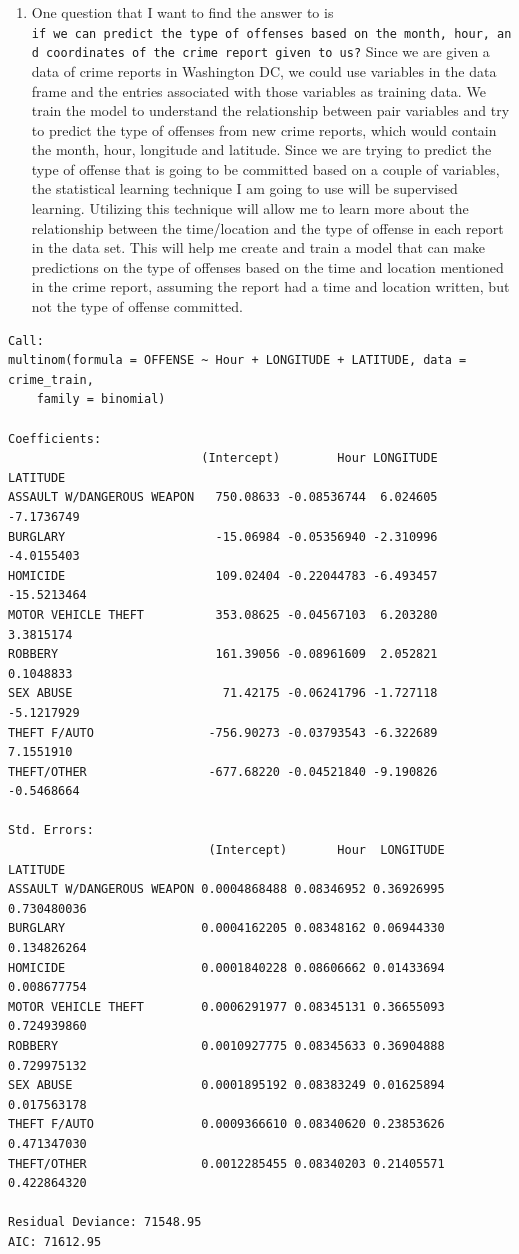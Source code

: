 \documentclass[
]{article}
\providecommand{\tightlist}{%
  \setlength{\itemsep}{0pt}\setlength{\parskip}{0pt}}
\begin{document}
\begin{enumerate}
\def\labelenumi{\arabic{enumi}.}
\tightlist
\item
  One question that I want to find the answer to is
  \texttt{if\ we\ can\ predict\ the\ type\ of\ offenses\ based\ on\ the\ month,\ hour,\ and\ coordinates\ of\ the\ crime\ report\ given\ to\ us?}
  Since we are given a data of crime reports in Washington DC, we could
  use variables in the data frame and the entries associated with those
  variables as training data. We train the model to understand the
  relationship between pair variables and try to predict the type of
  offenses from new crime reports, which would contain the month, hour,
  longitude and latitude. Since we are trying to predict the type of
  offense that is going to be committed based on a couple of variables,
  the statistical learning technique I am going to use will be
  supervised learning. Utilizing this technique will allow me to learn
  more about the relationship between the time/location and the type of
  offense in each report in the data set. This will help me create and
  train a model that can make predictions on the type of offenses based
  on the time and location mentioned in the crime report, assuming the
  report had a time and location written, but not the type of offense
  committed.
\end{enumerate}

\begin{verbatim}
Call:
multinom(formula = OFFENSE ~ Hour + LONGITUDE + LATITUDE, data = crime_train, 
    family = binomial)

Coefficients:
                           (Intercept)        Hour LONGITUDE    LATITUDE
ASSAULT W/DANGEROUS WEAPON   750.08633 -0.08536744  6.024605  -7.1736749
BURGLARY                     -15.06984 -0.05356940 -2.310996  -4.0155403
HOMICIDE                     109.02404 -0.22044783 -6.493457 -15.5213464
MOTOR VEHICLE THEFT          353.08625 -0.04567103  6.203280   3.3815174
ROBBERY                      161.39056 -0.08961609  2.052821   0.1048833
SEX ABUSE                     71.42175 -0.06241796 -1.727118  -5.1217929
THEFT F/AUTO                -756.90273 -0.03793543 -6.322689   7.1551910
THEFT/OTHER                 -677.68220 -0.04521840 -9.190826  -0.5468664

Std. Errors:
                            (Intercept)       Hour  LONGITUDE    LATITUDE
ASSAULT W/DANGEROUS WEAPON 0.0004868488 0.08346952 0.36926995 0.730480036
BURGLARY                   0.0004162205 0.08348162 0.06944330 0.134826264
HOMICIDE                   0.0001840228 0.08606662 0.01433694 0.008677754
MOTOR VEHICLE THEFT        0.0006291977 0.08345131 0.36655093 0.724939860
ROBBERY                    0.0010927775 0.08345633 0.36904888 0.729975132
SEX ABUSE                  0.0001895192 0.08383249 0.01625894 0.017563178
THEFT F/AUTO               0.0009366610 0.08340620 0.23853626 0.471347030
THEFT/OTHER                0.0012285455 0.08340203 0.21405571 0.422864320

Residual Deviance: 71548.95 
AIC: 71612.95 
\end{verbatim}
\end{document}
